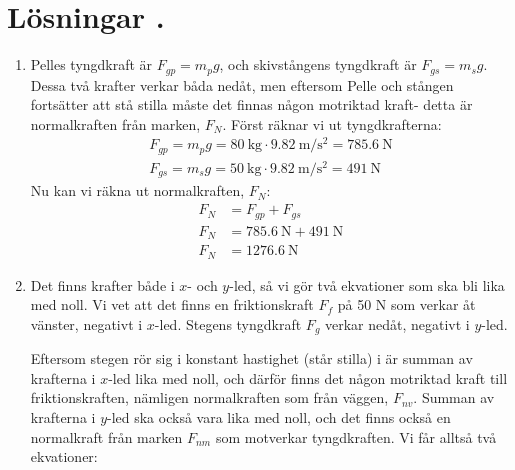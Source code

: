 \documentclass[11pt]{article}
\begin{document}
\section*{Lösningar \thesection.}
\begin{enumerate}[itemsep=2em]
        \item
              \begin{minipage}[t]{0.5\textwidth}
                      Pelles tyngdkraft är $F_{gp} = m_pg$, och skivstångens tyngdkraft är $F_{gs} = m_sg$. Dessa två krafter verkar båda nedåt, men eftersom Pelle och stången fortsätter att stå stilla måste det finnas någon motriktad kraft- detta är normalkraften från marken, $F_{N}$. Först räknar vi ut tyngdkrafterna:
                      \begin{gather*}
                              F_{gp} = m_pg = \SI{80}{\kilogram} \cdot \SI{9.82}{\meter/\second\squared} = \SI{785.6}{\newton} \\
                              F_{gs} = m_sg = \SI{50}{\kilogram} \cdot \SI{9.82}{\meter/\second\squared} = \SI{491}{\newton}
                      \end{gather*}
                      Nu kan vi räkna ut normalkraften, $F_{N}$:
                      \begin{align*}
                              F_{N} & = F_{gp} + F_{gs}                         \\
                              F_{N} & = \SI{785.6}{\newton} + \SI{491}{\newton} \\
                              F_{N} & = \SI{1276.6}{\newton}
                      \end{align*}
              \end{minipage}
              \hspace{2em}
              \begin{adjustbox}{valign=t}
                      
              \end{adjustbox}
        \item
              \begin{minipage}[t]{0.5\textwidth}
                      \raggedright
                      Det finns krafter både i $x$- och $y$-led, så vi gör två ekvationer som ska bli lika med noll. Vi vet att det finns en friktionskraft $F_f$ på 50 N som verkar åt vänster, negativt i $x$-led. Stegens tyngdkraft $F_{g}$ verkar nedåt, negativt i $y$-led.

                      Eftersom stegen rör sig i konstant hastighet (står stilla) i är summan av krafterna i $x$-led lika med noll, och därför finns det någon motriktad kraft till friktionskraften, nämligen normalkraften som från väggen, $F_{nv}$. Summan av krafterna i $y$-led ska också vara lika med noll, och det finns också en normalkraft från marken $F_{nm}$ som motverkar tyngdkraften. Vi får alltså två ekvationer:


\end{minipage}
\end{enumerate}
\end{document}
